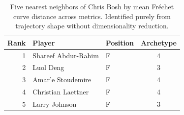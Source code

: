 \begin{table}[htbp]
  \centering\small
  \begin{tabular}{rllc}
    \toprule
    Rank & Player & Position & Archetype \\
    \midrule
    1 & Shareef Abdur-Rahim & F & 4 \\
    2 & Luol Deng & F & 3 \\
    3 & Amar'e Stoudemire & F & 4 \\
    4 & Christian Laettner & F & 4 \\
    5 & Larry Johnson & F & 3 \\
    \bottomrule
  \end{tabular}
  \caption{Five nearest neighbors of Chris Bosh by mean Fr\'{e}chet curve distance across metrics. Identified purely from trajectory shape without dimensionality reduction.}
  \label{tab:Chris_Bosh_frechet_curve_neighbors}
\end{table}

